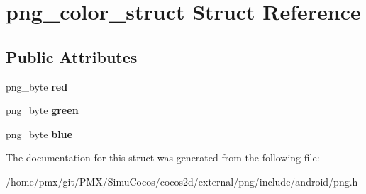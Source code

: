 \hypertarget{structpng__color__struct}{}\section{png\+\_\+color\+\_\+struct Struct Reference}
\label{structpng__color__struct}
\subsection*{Public Attributes}
\begin{DoxyCompactItemize}
\item 
\mbox{\label{structpng__color__struct_ad39dc2d7cb82e3670a3ad397bb4083cb}} 
png\+\_\+byte {\bfseries red}
\item 
\mbox{\label{structpng__color__struct_ada9b5a911b185eaf7c6b87934e9f11ce}} 
png\+\_\+byte {\bfseries green}
\item 
\mbox{\label{structpng__color__struct_a528e625b2778e787dc182e5df1164bbc}} 
png\+\_\+byte {\bfseries blue}
\end{DoxyCompactItemize}


The documentation for this struct was generated from the following file\+:\begin{DoxyCompactItemize}
\item 
/home/pmx/git/\+P\+M\+X/\+Simu\+Cocos/cocos2d/external/png/include/android/png.\+h\end{DoxyCompactItemize}

